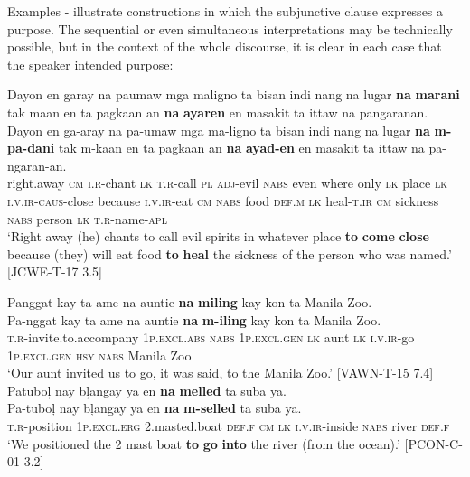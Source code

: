 Examples - illustrate constructions in which the subjunctive clause expresses a purpose. The sequential or even simultaneous interpretations may be technically possible, but in the context of the whole discourse, it is clear in each case that the speaker intended purpose:

\ea
\label{bkm:Ref474394726}
Dayon  en  garay  na  paumaw  mga  maligno  ta  bisan  indi nang  na  lugar  \textbf{na}  \textbf{marani}  tak  maan  en  ta  pagkaan an  \textbf{na}  \textbf{ayaren}  en  masakit  ta  ittaw  na  pangaranan. \smallskip\\
\gll Dayon  en  ga-aray  na  pa-umaw  mga  ma-ligno  ta  bisan  indi nang  na  lugar  \textbf{na}  \textbf{m-pa-dani}  tak  m-kaan  en  ta  pagkaan an  \textbf{na}  \textbf{ayad-en}  en  masakit  ta  ittaw  na  pa-ngaran-an. \\
right.away  \textsc{cm}  \textsc{i.r}-chant  \textsc{lk}  \textsc{t.r}-call  \textsc{pl}  \textsc{adj}-evil  \textsc{nabs}  even  where
only  \textsc{lk}  place  \textsc{lk}  \textsc{i.v.ir}-\textsc{caus}-close  because  \textsc{i.v.ir}-eat  \textsc{cm}  \textsc{nabs}  food
\textsc{def.m}  \textsc{lk}  heal-\textsc{t.ir}  \textsc{cm}  sickness  \textsc{nabs}  person  \textsc{lk}  \textsc{t.r-}name-\textsc{apl} \\
\glt `Right away (he) chants to call evil spirits in whatever place \textbf{to} \textbf{come} \textbf{close} because (they) will eat food \textbf{to} \textbf{heal} the sickness of the person who was named.’ [JCWE-T-17 3.5]
\z

\ea
Panggat  kay  ta  ame  na  auntie  \textbf{na}  \textbf{miling} kay  kon  ta  Manila  Zoo. \smallskip\\
\gll Pa-nggat  kay  ta  ame  na  auntie  \textbf{na}  \textbf{m-iling} kay  kon  ta  Manila  Zoo. \\
\textsc{t.r}-invite.to.accompany  1\textsc{p.excl.abs}  \textsc{nabs}  1\textsc{p.excl.gen}  \textsc{lk}  aunt  \textsc{lk}  \textsc{i.v.ir}-go
1\textsc{p.excl.gen}  \textsc{hsy}  \textsc{nabs}  Manila  Zoo \\
\glt `Our aunt invited us to go, it was said, to the Manila Zoo.’ [VAWN-T-15 7.4]
\z
\ea
Patuboļ  nay  bļangay  ya  en  \textbf{na}  \textbf{melled}  ta suba  ya. \smallskip\\
\gll Pa-tuboļ  nay  bļangay  ya  en  \textbf{na}  \textbf{m-selled}  ta suba  ya. \\
\textsc{t.r}-position  1\textsc{p.excl.erg}  2.masted.boat  \textsc{def.f}  \textsc{cm}  \textsc{lk}  \textsc{i.v.ir}-inside  \textsc{nabs}
river  \textsc{def.f} \\
\glt ‘We positioned the 2 mast boat \textbf{to} \textbf{go} \textbf{into} the river (from the ocean).’ [PCON-C-01 3.2]
\z

